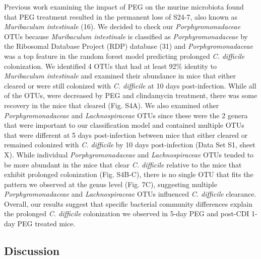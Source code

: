 \documentclass[
  11pt,
]{article}
\begin{document}
Previous work examining the impact of PEG on the murine microbiota found
that PEG treatment resulted in the permanent loss of S24-7, also known
as \emph{Muribaculum intestinale} (16). We decided to check our
\emph{Porphyromonadaceae} OTUs because \emph{Muribaculum intestinale} is
classified as \emph{Porphyromonadaceae} by the Ribosomal Database
Project (RDP) database (31) and \emph{Porphyromonadaceae} was a top
feature in the random forest model predicting prolonged \emph{C.
difficile} colonization. We identified 4 OTUs that had at least 92\%
identity to \emph{Muribaculum intestinale} and examined their abundance
in mice that either cleared or were still colonized with \emph{C.
difficile} at 10 days post-infection. While all of the OTUs, were
decreased by PEG and clindamycin treatment, there was some recovery in
the mice that cleared (Fig. S4A). We also examined other
\emph{Porphyromonadaceae} and \emph{Lachnospiraceae} OTUs since these
were the 2 genera that were important to our classification model and
contained multiple OTUs that were different at 5 days post-infection
between mice that either cleared or remained colonized with \emph{C.
difficile} by 10 days post-infection (Data Set S1, sheet X). While
individual \emph{Porphyromonadaceae} and \emph{Lachnospiraceae} OTUs
tended to be more abundant in the mice that clear \emph{C. difficile}
relative to the mice that exhibit prolonged colonization (Fig. S4B-C),
there is no single OTU that fits the pattern we observed at the genus
level (Fig. 7C), suggesting multiple \emph{Porphyromonadaceae} and
\emph{Lachnospiraceae} OTUs influenced \emph{C. difficile} clearance.
Overall, our results suggest that specific bacterial community
differences explain the prolonged \emph{C. difficile} colonization we
observed in 5-day PEG and post-CDI 1-day PEG treated mice.

\hypertarget{discussion}{%
\subsection{Discussion}\label{discussion}}
\end{document}

